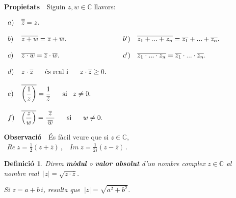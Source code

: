 \documentclass[12pt]{article}
\newcommand{\propietats}{\textbf{Propietats}\ \ }
\newcommand{\observacio}{\textbf{Observaci{\'o}}\ \ }
\newtheorem{definicio}{Definici{\'o}}[subsection]
\newcommand{\C}{\mathbb{C}}
\begin{document}
\propietats Siguin $z,w \in \C$ llavors:

\hspace{1.5cm}$\begin{array}{llll}
    a) & \overline{\overline{z}}=z. & &\\
     & & &  \\
   b)& \overline{z+w}=\overline{z}+\overline{w}.& \hspace{0.5cm}
      b')&
    \overline{z_{1}+...+z_{n}}=\overline{z_{1}}+...+\overline{z_{n}}.  \\
    & & &  \\
      c)& \overline{z\cdot w}=\overline{z}\cdot \overline{w}. &
      \hspace{0.5cm}c')&
    \overline{z_{1}\cdot ...\cdot z_{n}}=\overline{z_{1}}\cdot ...\cdot \overline{z_{n}}.  \\
    & & &  \\
    d)& z\cdot \overline{z}\hspace{0.6cm} \textrm{\'{e}s real i} \hspace{0.6cm}
    z\cdot \overline{z}\geq 0.& &\\
     & & &  \\
   e)& \displaystyle\overline{\left(\frac{1}{z}\right)}=\frac{1}{\overline{z}}\hspace{0.6cm}
   \textrm{si} \hspace{0.3cm} z\neq 0. & &\\
     & & &  \\
    f)& \displaystyle\overline{\left(\frac{z}{w}\right)}=\frac{\ \overline{z}\
    }{\overline{w}}\hspace{0.6cm} \textrm{si} \hspace{0.6cm} w\neq 0.& &\\
      \end{array}$

\vspace{0.4cm}
\observacio  {\'E}s f{\`a}cil veure que si $z\in \C$, $\ \ Re\
z=\displaystyle\frac{1}{2}(z+\overline{z})\,, \ \ \ \ Im\
z=\displaystyle\frac{1}{2i}(z-\overline{z})\,.$\\


\begin{definicio}

Direm \textbf{m{\`o}dul} o \textbf{valor absolut} d'un nombre
complex $z\in \C$ al nombre real $\ |z|=\sqrt{z\cdot \overline{z}}$.

Si $z=a+b\,i$, resulta que $\ |z|=\sqrt{a^2+b^2}$.
\end{definicio}
\end{document}
